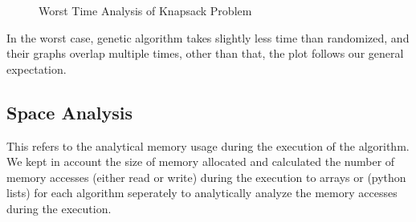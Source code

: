 \documentclass[a4paper, 11pt]{article}
\begin{document}
\begin{figure}[!ht] 
  \caption{Worst Time Analysis of Knapsack Problem} 
  \centering
  \label{fig:WorstMemoryAnalysis}
\end{figure}

In the worst case, genetic algorithm takes slightly less time than randomized, and their graphs overlap multiple times, other than that, the plot follows our general expectation.


\subsection{Space Analysis}
This refers to the analytical memory usage during the execution of the algorithm. We kept in account the size of memory allocated and calculated the number of memory accesses (either read or write) during the execution to arrays or (python lists) for each algorithm seperately to analytically analyze the memory accesses during the execution. 
\end{document}
